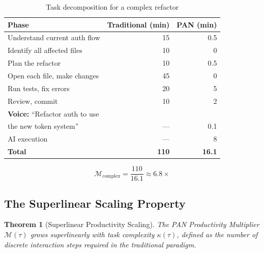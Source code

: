\documentclass[11pt, a4paper]{article}
\newtheorem{theorem}{Theorem}
\begin{document}
\begin{table}[h]
\centering
\begin{tabular}{@{}lrr@{}}
\toprule
\textbf{Phase} & \textbf{Traditional (min)} & \textbf{PAN (min)} \\
\midrule
Understand current auth flow           & 15  & 0.5 \\
Identify all affected files            & 10  & 0   \\
Plan the refactor                      & 10  & 0.5 \\
Open each file, make changes           & 45  & 0   \\
Run tests, fix errors                  & 20  & 5   \\
Review, commit                         & 10  & 2   \\
\midrule
\textbf{Voice:} ``Refactor auth to use  &     &     \\
\quad the new token system''           & --- & 0.1 \\
AI execution                           & --- & 8   \\
\midrule
\textbf{Total}                         & \textbf{110} & \textbf{16.1} \\
\bottomrule
\end{tabular}
\caption{Task decomposition for a complex refactor}
\label{tab:example2}
\end{table}

\begin{equation}
  \mathcal{M}_{\text{complex}} = \frac{110}{16.1} \approx 6.8\times
\end{equation}

\subsection{The Superlinear Scaling Property}

\begin{theorem}[Superlinear Productivity Scaling]
\label{thm:superlinear}
The PAN Productivity Multiplier $\mathcal{M}(\tau)$ grows superlinearly with
task complexity $\kappa(\tau)$, defined as the number of discrete interaction
steps required in the traditional paradigm.
\end{theorem}
\end{document}
